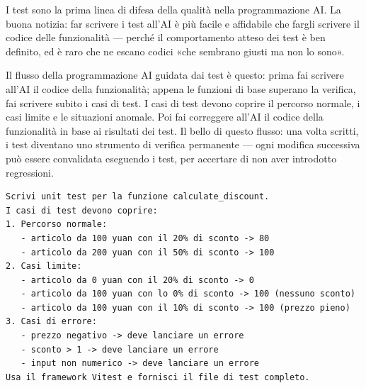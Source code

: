 


I test sono la prima linea di difesa della qualità nella programmazione AI. La buona notizia: far scrivere i test all'AI è più facile e affidabile che fargli scrivere il codice delle funzionalità — perché il comportamento atteso dei test è ben definito, ed è raro che ne escano codici «che sembrano giusti ma non lo sono».

Il flusso della programmazione AI guidata dai test è questo: prima fai scrivere all'AI il codice della funzionalità; appena le funzioni di base superano la verifica, fai scrivere subito i casi di test. I casi di test devono coprire il percorso normale, i casi limite e le situazioni anomale. Poi fai correggere all'AI il codice della funzionalità in base ai risultati dei test. Il bello di questo flusso: una volta scritti, i test diventano uno strumento di verifica permanente — ogni modifica successiva può essere convalidata eseguendo i test, per accertare di non aver introdotto regressioni.

\begin{lstlisting}
Scrivi unit test per la funzione calculate_discount.
I casi di test devono coprire:
1. Percorso normale:
   - articolo da 100 yuan con il 20% di sconto -> 80
   - articolo da 200 yuan con il 50% di sconto -> 100
2. Casi limite:
   - articolo da 0 yuan con il 20% di sconto -> 0
   - articolo da 100 yuan con lo 0% di sconto -> 100 (nessuno sconto)
   - articolo da 100 yuan con il 10% di sconto -> 100 (prezzo pieno)
3. Casi di errore:
   - prezzo negativo -> deve lanciare un errore
   - sconto > 1 -> deve lanciare un errore
   - input non numerico -> deve lanciare un errore
Usa il framework Vitest e fornisci il file di test completo.
\end{lstlisting}

